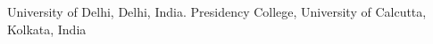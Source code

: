%
%
%


\begin{scholarship}
					{University of Delhi, Delhi, India.}
					{Presidency College, University of Calcutta, Kolkata, India}
\end{scholarship}
